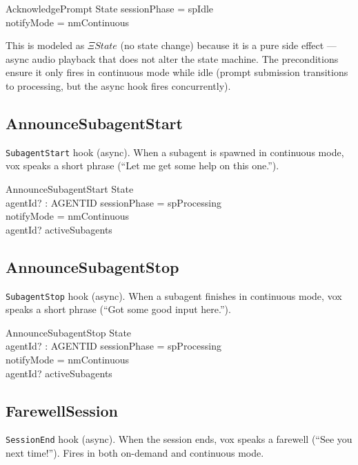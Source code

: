 \documentclass[a4paper,10pt,fleqn]{article}
\begin{document}
\begin{schema}{AcknowledgePrompt}
  \Xi State
  \where
  sessionPhase = spIdle \\
  notifyMode = nmContinuous
\end{schema}

This is modeled as $\Xi State$ (no state change) because it is a
pure side effect --- async audio playback that does not alter the
state machine. The preconditions ensure it only fires in continuous
mode while idle (prompt submission transitions to processing, but
the async hook fires concurrently).

\subsection{AnnounceSubagentStart}

\texttt{SubagentStart} hook (async). When a subagent is spawned in
continuous mode, vox speaks a short phrase (``Let me get some help
on this one.'').

\begin{schema}{AnnounceSubagentStart}
  \Xi State \\
  agentId? : AGENTID
  \where
  sessionPhase = spProcessing \\
  notifyMode = nmContinuous \\
  agentId? \in activeSubagents
\end{schema}

\subsection{AnnounceSubagentStop}

\texttt{SubagentStop} hook (async). When a subagent finishes in
continuous mode, vox speaks a short phrase (``Got some good input
here.'').

\begin{schema}{AnnounceSubagentStop}
  \Xi State \\
  agentId? : AGENTID
  \where
  sessionPhase = spProcessing \\
  notifyMode = nmContinuous \\
  agentId? \notin activeSubagents
\end{schema}

\subsection{FarewellSession}

\texttt{SessionEnd} hook (async). When the session ends, vox speaks
a farewell (``See you next time!''). Fires in both on-demand and
continuous mode.
\end{document}
